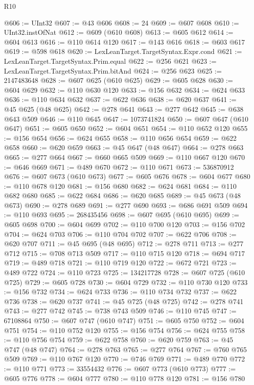 \begin{lexlean}{R10}
\begin{coremodule}
@606 := UInt32
@607 := @43 @606
@608 := 24
@609 := @607 @608
@610 := UInt32.instOfNat
@612 := @609 (@610 @608)
@613 := @605 @612
@614 := @604 @613
@616 := @110 @614 @120
@617 := @143 @616
@618 := @603 @617
@619 := @598 @618
@620 := LexLeanTarget.TargetSyntax.Expr.cond
@621 := LexLeanTarget.TargetSyntax.Prim.equal
@622 := @256 @621
@623 := LexLeanTarget.TargetSyntax.Prim.bitAnd
@624 := @256 @623
@625 := 2147483648
@628 := @607 @625 (@610 @625)
@629 := @605 @628
@630 := @604 @629
@632 := @110 @630 @120
@633 := @156 @632
@634 := @624 @633
@636 := @110 @634 @632
@637 := @622 @636
@638 := @620 @637
@641 := @45 @625 (@48 @625)
@642 := @278 @641
@643 := @277 @642
@645 := @638 @643 @509
@646 := @110 @645
@647 := 1073741824
@650 := @607 @647 (@610 @647)
@651 := @605 @650
@652 := @604 @651
@654 := @110 @652 @120
@655 := @156 @654
@656 := @624 @655
@658 := @110 @656 @654
@659 := @622 @658
@660 := @620 @659
@663 := @45 @647 (@48 @647)
@664 := @278 @663
@665 := @277 @664
@667 := @660 @665 @509
@669 := @110 @667 @120
@670 := @646 @669
@671 := @489 @670
@672 := @110 @671
@673 := 536870912
@676 := @607 @673 (@610 @673)
@677 := @605 @676
@678 := @604 @677
@680 := @110 @678 @120
@681 := @156 @680
@682 := @624 @681
@684 := @110 @682 @680
@685 := @622 @684
@686 := @620 @685
@689 := @45 @673 (@48 @673)
@690 := @278 @689
@691 := @277 @690
@693 := @686 @691 @509
@694 := @110 @693
@695 := 268435456
@698 := @607 @695 (@610 @695)
@699 := @605 @698
@700 := @604 @699
@702 := @110 @700 @120
@703 := @156 @702
@704 := @624 @703
@706 := @110 @704 @702
@707 := @622 @706
@708 := @620 @707
@711 := @45 @695 (@48 @695)
@712 := @278 @711
@713 := @277 @712
@715 := @708 @713 @509
@717 := @110 @715 @120
@718 := @694 @717
@719 := @489 @718
@721 := @110 @719 @120
@722 := @672 @721
@723 := @489 @722
@724 := @110 @723
@725 := 134217728
@728 := @607 @725 (@610 @725)
@729 := @605 @728
@730 := @604 @729
@732 := @110 @730 @120
@733 := @156 @732
@734 := @624 @733
@736 := @110 @734 @732
@737 := @622 @736
@738 := @620 @737
@741 := @45 @725 (@48 @725)
@742 := @278 @741
@743 := @277 @742
@745 := @738 @743 @509
@746 := @110 @745
@747 := 67108864
@750 := @607 @747 (@610 @747)
@751 := @605 @750
@752 := @604 @751
@754 := @110 @752 @120
@755 := @156 @754
@756 := @624 @755
@758 := @110 @756 @754
@759 := @622 @758
@760 := @620 @759
@763 := @45 @747 (@48 @747)
@764 := @278 @763
@765 := @277 @764
@767 := @760 @765 @509
@769 := @110 @767 @120
@770 := @746 @769
@771 := @489 @770
@772 := @110 @771
@773 := 33554432
@776 := @607 @773 (@610 @773)
@777 := @605 @776
@778 := @604 @777
@780 := @110 @778 @120
@781 := @156 @780

\end{coremodule}
\end{lexlean}
